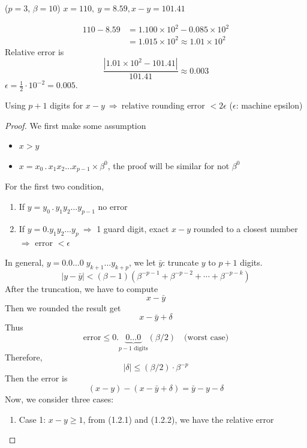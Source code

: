 \begin{eg}
    ($p=3$, $\beta=10$) $x = 110, \ y = 8.59, x-y = 101.41$
\end{eg}
\begin{align*}
    110 - 8.59 &= 1.100 \times 10^{2} - 0.085 \times 10^{2} \\ 
    &= 1.015 \times 10^{2} \approx 1.01 \times 10^{2}
\end{align*}
Relative error is \[
    \frac{|1.01 \times 10^{2} - 101.41|}{101.41} \approx 0.003
\]
\(\epsilon = \frac{1}{2} \cdot 10^{-2} = 0.005\).

\begin{theorem}
    Using $p+1$ digits for $x-y \ \Rightarrow \ \text{relative}$ rounding error $< 2\epsilon$ ($\epsilon$: machine epsilon)
\end{theorem}
\begin{proof}
    We first make some assumption
    \begin{itemize}
        \item $x > y$
        \item $x = x_0\, .\, x_1x_2\ldots x_{p-1} \times \beta^{0}$, the proof will be similar for not $\beta^0$
    \end{itemize}
    For the first two condition,
    \begin{enumerate}
        \item If $y = y_0\, .\, y_1y_2\ldots y_{p-1}$ no error
        \item If $y = 0. y_1y_2\ldots y_{p}\ \Rightarrow$ 1 guard digit, exact $x-y$ rounded to a closest number $\Rightarrow$ error $< \epsilon$
    \end{enumerate}
    In general, $y = 0.0\ldots0\;y_{k+1}\ldots y_{k+p}$, we let $\bar{y}$: truncate $y$ to $p+1$ digits.
    \[
        |y - \bar{y}| < (\beta - 1)(\beta^{-p-1} + \beta^{-p-2} + \cdots + \beta^{-p-k}) \tag{1.2.1}
    \]
    After the truncation, we have to compute \[
        x - \bar{y}
    \]
    Then we rounded the result get \[
        x - \bar{y} + \delta
    \]
    Thus \[
        \text{error} \leq 0.\underbrace{0\ldots0}_{p-1 \text{ digits}}(\beta/2) \quad \text{(worst case)}
    \]
    Therefore, \[
        |\delta| \leq (\beta/2) \cdot \beta^{-p} \tag{1.2.2}
    \]
    Then the error is \[
        (x - y) - (x - \bar{y} + \delta) = \bar{y} - y - \delta
    \]
    Now, we consider three cases:
    \begin{enumerate}[label=$\arabic*^\circ$]
        \item Case 1: $x - y \geq 1$, from (1.2.1) and (1.2.2), we have the relative error 

\end{enumerate}
\end{proof}
